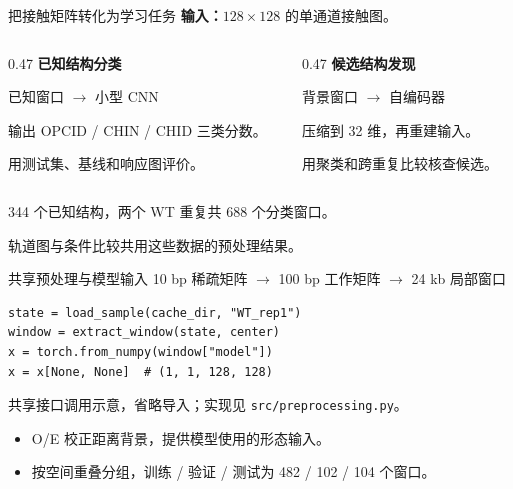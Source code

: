 \begin{frame}{把接触矩阵转化为学习任务}
\textbf{输入：}$128\times128$ 的单通道接触图。
\vspace{0.8em}
\begin{columns}[T,onlytextwidth]
\begin{column}{0.47\textwidth}
\textcolor{projectblue}{\large\textbf{已知结构分类}}\par\vspace{0.5em}
已知窗口 $\longrightarrow$ 小型 CNN\par\vspace{0.5em}
输出 OPCID / CHIN / CHID 三类分数。\par\vspace{0.5em}
用测试集、基线和响应图评价。
\end{column}
\begin{column}{0.47\textwidth}
\textcolor{projectblue}{\large\textbf{候选结构发现}}\par\vspace{0.5em}
背景窗口 $\longrightarrow$ 自编码器\par\vspace{0.5em}
压缩到 32 维，再重建输入。\par\vspace{0.5em}
用聚类和跨重复比较核查候选。
\end{column}
\end{columns}
\vspace{1.2em}
\small 344 个已知结构，两个 WT 重复共 688 个分类窗口。\par
轨道图与条件比较共用这些数据的预处理结果。
\end{frame}

\begin{frame}[fragile]{共享预处理与模型输入}
10 bp 稀疏矩阵 $\longrightarrow$ 100 bp 工作矩阵 $\longrightarrow$ 24 kb 局部窗口
\vspace{0.5em}
\begin{lstlisting}
state = load_sample(cache_dir, "WT_rep1")
window = extract_window(state, center)
x = torch.from_numpy(window["model"])
x = x[None, None]  # (1, 1, 128, 128)
\end{lstlisting}
\scriptsize 共享接口调用示意，省略导入；实现见 \texttt{src/preprocessing.py}。\par
\vspace{0.5em}
\normalsize
\begin{itemize}
\item O/E 校正距离背景，提供模型使用的形态输入。
\item 按空间重叠分组，训练 / 验证 / 测试为 482 / 102 / 104 个窗口。
\end{itemize}
\end{frame}
